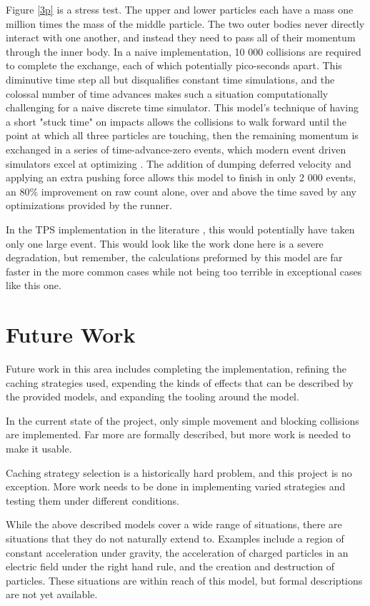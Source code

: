\documentclass[conference]{IEEEtran}
\begin{document}
Figure \ref{3p} is a stress test. The upper and lower particles each have a mass one million times the mass of the middle particle. The two outer bodies never directly interact with one another, and instead they need to pass all of their momentum through the inner body. In a naive implementation, 10 000 collisions are required to complete the exchange, each of which potentially pico-seconds apart. This diminutive time step all but disqualifies constant time simulations, and the colossal number of time advances makes such a situation computationally challenging for a naive discrete time simulator. This model's technique of having a short "stuck time" on impacts allows the collisions to walk forward until the point at which all three particles are touching, then the remaining momentum is exchanged in a series of time-advance-zero events, which modern event driven simulators excel at optimizing \cite{time-advance-0}. The addition of dumping deferred velocity and applying an extra pushing force allows this model to finish in only 2 000 events, an 80\% improvement on raw count alone, over and above the time saved by any optimizations provided by the runner.

In the TPS implementation in the literature \cite{TPS-thesis}\cite{TPS-article}, this would potentially have taken only one large event. This would look like the work done here is a severe degradation, but remember, the calculations preformed by this model are far faster in the more common cases while not being too terrible in exceptional cases like this one. 


\section{Future Work}

Future work in this area includes completing the implementation, refining the caching strategies used, expending the kinds of effects that can be described by the provided models, and expanding the tooling around the model.

In the current state of the project, only simple movement and blocking collisions are implemented. Far more are formally described, but more work is needed to make it usable.

Caching strategy selection is a historically hard problem, and this project is no exception. More work needs to be done in implementing varied strategies and testing them under different conditions.

While the above described models cover a wide range of situations, there are situations that they do not naturally extend to. Examples include a region of constant acceleration under gravity, the acceleration of charged particles in an electric field under the right hand rule, and the creation and destruction of particles. These situations are within reach of this model, but formal descriptions are not yet available.
\end{document}
